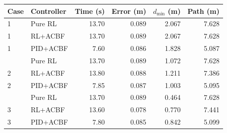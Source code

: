 \begin{tabular}{llrrrr}
\toprule
Case & Controller & Time (s) & Error (m) & $d_{\min}$ (m) & Path (m)\\
\midrule
1 & Pure RL & 13.70 & 0.089 & 2.067 & 7.628 \\
1 & RL+ACBF & 13.70 & 0.089 & 2.067 & 7.628 \\
1 & PID+ACBF & 7.60 & 0.086 & 1.828 & 5.087 \\
\addlinespace
2 & Pure RL & 13.70 & 0.089 & 1.072 & 7.628 \\
2 & RL+ACBF & 13.80 & 0.088 & 1.211 & 7.386 \\
2 & PID+ACBF & 7.85 & 0.087 & 1.003 & 5.095 \\
\addlinespace
3 & Pure RL & 13.70 & 0.089 & 0.464 & 7.628 \\
3 & RL+ACBF & 13.60 & 0.078 & 0.770 & 7.441 \\
3 & PID+ACBF & 7.80 & 0.085 & 0.842 & 5.099 \\
\bottomrule
\end{tabular}